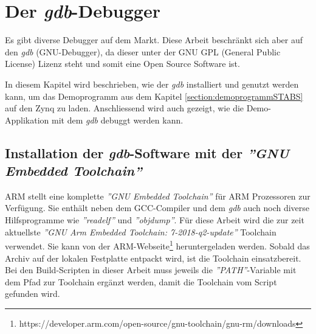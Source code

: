 \chapter{Der \textit{gdb}-Debugger}
\label{chapter:Der-gdb-Debugger}
Es gibt diverse Debugger auf dem Markt.
Diese Arbeit beschränkt sich aber auf den  \textit{gdb} (GNU-Debugger), da dieser unter der GNU GPL (General Public License) Lizenz steht und somit eine Open Source Software ist.

In diesem Kapitel wird beschrieben, wie der \textit{gdb} installiert und genutzt werden kann, um das Demoprogramm aus dem Kapitel \ref{section:demoprogrammSTABS} auf den Zynq zu laden.
Anschliessend wird auch gezeigt, wie die Demo-Applikation mit dem \textit{gdb} debuggt werden kann.


\section{Installation der \textit{gdb}-Software mit der \textit{''GNU Embedded Toolchain''} }
\label{section:installationGDB}
ARM stellt eine komplette \textit{''GNU Embedded Toolchain''} für ARM Prozessoren zur Verfügung.
Sie enthält neben dem GCC-Compiler und dem \textit{gdb} auch noch diverse Hilfsprogramme wie \textit{''readelf''} und \textit{''objdump''}.
Für diese Arbeit wird die zur zeit aktuellste \textit{''GNU Arm Embedded Toolchain: 7-2018-q2-update''} Toolchain verwendet.
Sie kann von der ARM-Webseite\footnote{https://developer.arm.com/open-source/gnu-toolchain/gnu-rm/downloads} heruntergeladen werden.
Sobald das Archiv auf der lokalen Festplatte entpackt wird, ist die Toolchain einsatzbereit.
Bei den Build-Scripten in dieser Arbeit muss jeweils die \textit{''PATH''}-Variable mit dem Pfad zur Toolchain ergänzt werden, damit die Toolchain vom Script gefunden wird.


